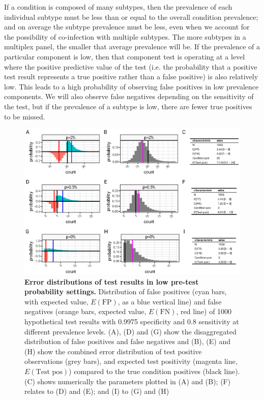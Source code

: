 \documentclass[10pt,letterpaper]{article}
\begin{document}
If a condition is composed of many subtypes, then the prevalence of each individual subtype must be less than or equal to the overall condition prevalence; and on average the subtype prevalence must be less, even when we account for the possibility of co-infection with multiple subtypes. The more subtypes in a multiplex panel, the smaller that average prevalence will be. If the prevalence of a particular component is low, then that component test is operating at a level where the positive predictive value of the test (i.e. the probability that a positive test result represents a true positive rather than a false positive) is also relatively low. This leads to a high probability of observing false positives in low prevalence components. We will also observe false negatives depending on the sensitivity of the test, but if the prevalence of a subtype is low, there are fewer true positives to be missed.

\begin{figure}[hb!]
\centerline{\includegraphics{fig/fig2-low-prevalence-sensitivity-specificity.eps}}
\caption{{\bf Error distributions of test results in low pre-test probability settings.}
 Distribution of false positives (cyan bars, with expected value, \(E(\textrm{FP})\), as a blue vertical line) and false negatives (orange bars, expected value, \(E(\textrm{FN})\), red line) of 1000 hypothetical test results with 0.9975 specificity and 0.8 sensitivity at different prevalence levels. (A), (D) and (G) show the disaggregated distribution of false positives and false negatives and (B), (E) and (H) show the combined error distribution of test positive observations (grey bars), and expected test positivity (magenta line, \(E(\textrm{Test pos})\)) compared to the true condition positives (black line). (C) shows numerically the parameters plotted in (A) and (B); (F) relates to (D) and (E); and (I) to (G) and (H)}
\label{fig2}
\end{figure}
\end{document}
